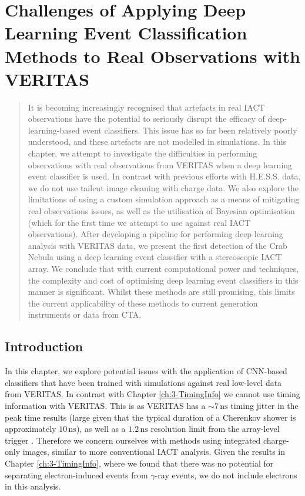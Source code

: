 \chapter{\label{ch:4-VERITASRealData} Challenges of Applying Deep Learning Event Classification Methods to Real Observations with VERITAS}
\minitoc
\begin{abstract}
    It is becoming increasingly recognised that artefacts in real IACT observations have the potential to seriously disrupt the efficacy of deep-learning-based event classifiers. This issue has so far been relatively poorly understood, and these artefacts are not modelled in simulations. In this chapter, we attempt to investigate the difficulties in performing observations with real observations from VERITAS when a deep learning event classifier is used. In contrast with previous efforts with H.E.S.S. data, we do not use tailcut image cleaning with charge data. We also explore the limitations of using a custom simulation approach as a means of mitigating real observations issues, as well as the utilisation of Bayesian optimisation (which for the first time we attempt to use against real IACT observations). After developing a pipeline for performing deep learning analysis with VERITAS data, we present the first detection of the Crab Nebula using a deep learning event classifier with a stereoscopic IACT array. We conclude that with current computational power and techniques, the complexity and cost of optimising deep learning event classifiers in this manner is significant. Whilst these methods are still promising, this limits the current applicability of these methods to current generation instruments or data from CTA.
\end{abstract}

\section{Introduction}

In this chapter, we explore potential issues with the application of CNN-based classifiers that have been trained with simulations against real low-level data from VERITAS. In contrast with Chapter \ref{ch:3-TimingInfo} we cannot use timing information with VERITAS. This is as VERITAS has a $\mathrm{\sim7\,ns}$ timing jitter in the peak time results (large given that the typical duration of a Cherenkov shower is approximately $\mathrm{10\,ns}$), as well as a $1.2\,\mathrm{ns}$ resolution limit from the array-level trigger \cite{veritastrigger}. Therefore we concern ourselves with methods using integrated charge-only images, similar to more conventional IACT analysis. Given the results in Chapter \ref{ch:3-TimingInfo}, where we found that there was no potential for separating electron-induced events from $\gamma$-ray events, we do not include electrons in this analysis. 

